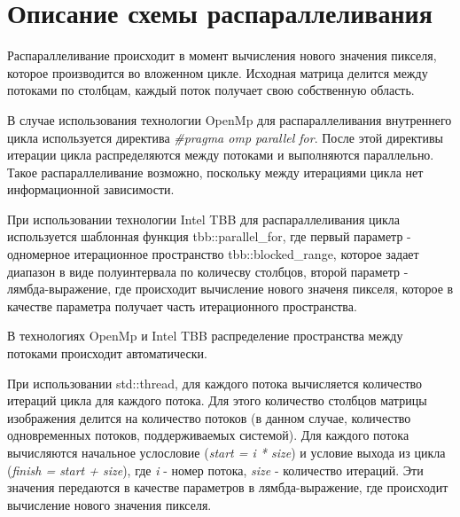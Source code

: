 \documentclass{report}
\begin{document}
\section*{Описание схемы распараллеливания}
\par Распараллеливание происходит в момент вычисления нового значения пикселя, которое производится во вложенном цикле. Исходная матрица делится между потоками по столбцам, каждый поток получает свою собственную область.
\par В случае использования технологии OpenMp для распараллеливания внутреннего цикла используется директива \textsl{\#pragma omp parallel for}. После этой директивы итерации цикла распределяются между потоками и выполняются параллельно. Такое распараллеливание возможно, поскольку между итерациями цикла нет информационной зависимости.
\par При использовании технологии Intel TBB для распараллеливания цикла используется  шаблонная функция tbb::parallel\_for, где первый параметр - одномерное итерационное пространство tbb::blocked\_range, которое задает диапазон в виде полуинтервала по количесву столбцов, второй параметр - лямбда-выражение, где происходит вычисление нового значеня пикселя, которое в качестве параметра получает часть итерационного пространства.
\par В технологиях OpenMp и Intel TBB распределение пространства между потоками происходит автоматически.
\par При использовании std::thread, для каждого потока вычисляется количество итераций цикла для каждого потока. Для этого количество столбцов матрицы изображения делится на количество потоков (в данном случае, количество одновременных потоков, поддерживаемых системой). Для каждого потока вычисляются начальное услословие (\textsl{start = i * size}) и условие выхода из цикла (\textsl{finish = start + size}), где \textsl{i} - номер потока, \textsl{size} - количество итераций. Эти значения передаются в качестве параметров в лямбда-выражение, где происходит вычисление нового значения пикселя.
\newpage

\end{document}
